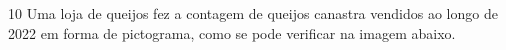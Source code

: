{{{\begin{escolha}
{{{{{\begin{escolha}
\begin{escolha}
{\begin{q°}


\num{10} Uma loja de queijos fez a contagem de queijos canastra vendidos ao
longo de 2022 em forma de pictograma, como se pode verificar na imagem abaixo. 


\end{q°}}
\end{escolha}
\end{escolha}}}}}}
\end{escolha}}}}
